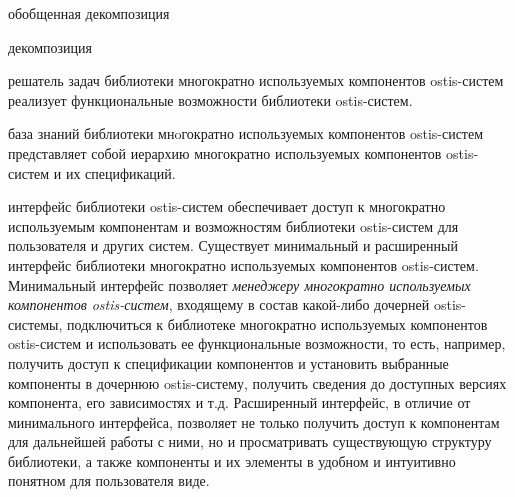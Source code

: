 \begin{SCn}
	\begin{scnrelfromset}{обобщенная декомпозиция}
		\begin{scnindent}
			\begin{scnrelfromset}{декомпозиция}
				\begin{scnindent}
				\end{scnindent}
			\end{scnrelfromset}
		\end{scnindent}
	\end{scnrelfromset}
\end{SCn}

решатель задач библиотеки многократно используемых компонентов ostis-систем реализует функциональные возможности библиотеки ostis-систем.

база знаний библиотеки мнoгократно используемых компонентов ostis-систем представляет собой иерархию многократно используемых компонентов ostis-систем и их спецификаций.

интерфейс библиотеки ostis-систем обеспечивает доступ к многократно используемым компонентам и возможностям библиотеки ostis-систем для пользователя и других систем. Существует минимальный и расширенный интерфейс библиотеки многократно используемых компонентов ostis-систем. Минимальный интерфейс позволяет \textit{менеджеру многократно используемых компонентов ostis-систем}, входящему в состав какой-либо дочерней ostis-системы, подключиться к библиотеке многократно используемых компонентов ostis-систем и использовать ее функциональные возможности, то есть, например, получить доступ к спецификации компонентов и установить выбранные компоненты в дочернюю ostis-систему, получить сведения до доступных версиях компонента, его зависимостях и т.д. Расширенный интерфейс, в отличие от минимального интерфейса, позволяет не только получить доступ к компонентам для дальнейшей работы с ними, но и просматривать существующую структуру библиотеки,  а также компоненты и их элементы в удобном и интуитивно понятном для пользователя виде.

